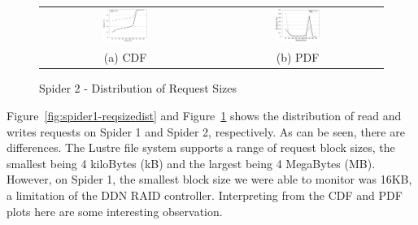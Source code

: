 \begin{figure}[!t]
\begin{center}
\begin{tabular}{cc}
\hspace*{-1cm}                                                           
{\includegraphics[width=0.27\textwidth]{./figs/spider2-reqSizeCDF.eps}}&
\hspace{-2mm}
{\includegraphics[width=0.27\textwidth]{./figs/spider2-reqSizePDF.eps}}\\
\small (a) CDF & \small(b) PDF \\
\end{tabular}
\vspace{-0.1in}
\caption{Spider 2 - Distribution of Request Sizes}
\label{fig:spider2-reqsizedist}
\end{center}
\end{figure}

Figure~\ref{fig:spider1-reqsizedist} and Figure~\ref{fig:spider2-reqsizedist}
shows the distribution of read and writes requests on Spider 1 and Spider 2,
respectively. As can be seen, there are differences. The Lustre file system
supports a range of request block sizes, the smallest being 4 kiloBytes (kB)
and the largest being 4 MegaBytes (MB).  However, on Spider 1, the smallest
block size we were able to monitor was 16KB, a limitation of the DDN RAID
controller. Interpreting from the CDF and PDF plots here are some interesting
observation.

